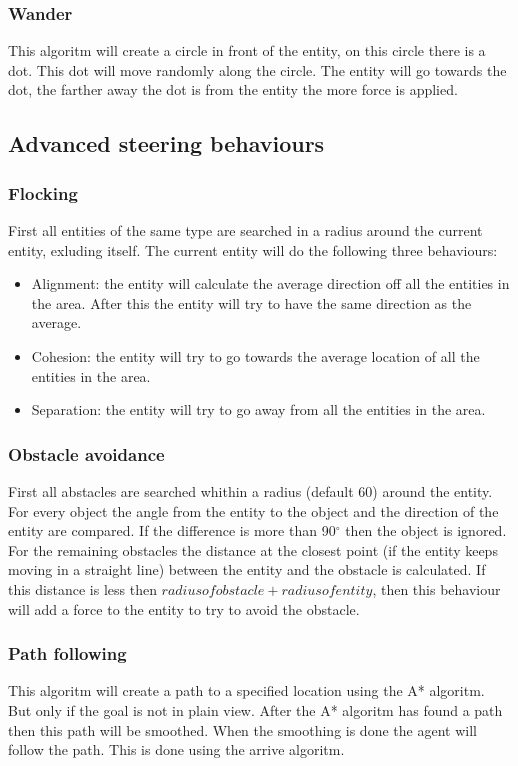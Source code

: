 \documentclass{article}
\begin{document}
   \subsubsection {Wander}
  This algoritm will create a circle in front of the entity, on this circle there is a dot. This dot will move randomly along the circle. The entity will go towards the dot, the farther away the dot is from the entity the more force is applied. 
  \subsection{Advanced steering behaviours}
  \subsubsection {Flocking}
  First all entities of the same type are searched in a radius around the current entity, exluding itself. The current entity will do the following three behaviours: 
  \begin{itemize}
  \item Alignment: the entity will calculate the average direction off all the entities in the area. After this the entity will try to have the same direction as the average.
  \item Cohesion: the entity will try to go towards the average location of all the entities in the area.
  \item Separation: the entity  will try to go away from all the entities in the area. 
  \end{itemize}
  \subsubsection {Obstacle avoidance}
  First all abstacles are searched whithin a radius (default 60) around the entity. For every object the angle from the entity to the object and the direction of the entity are compared. If the difference is more than 90$^{\circ}$ then the object is ignored. For the remaining obstacles the distance at the closest point (if the entity keeps moving in a straight line) between the entity and the obstacle is calculated. If this distance is less then \(radius of obstacle + radius of entity\), then this behaviour will add a force to the entity to try to avoid the obstacle.
  \subsubsection {Path following}
   This algoritm will create a path to a specified location using the A* algoritm. But only if the goal is not in plain view. After the A* algoritm has found a path then this path will be smoothed. When the smoothing is done the agent will follow the path. This is done using the arrive algoritm. 
   \newpage
   
\end{document}
